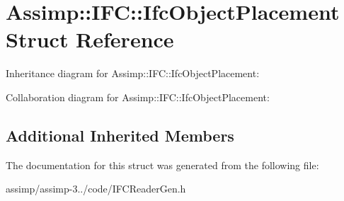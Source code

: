 \hypertarget{struct_assimp_1_1_i_f_c_1_1_ifc_object_placement}{\section{Assimp\+:\+:I\+F\+C\+:\+:Ifc\+Object\+Placement Struct Reference}
\label{struct_assimp_1_1_i_f_c_1_1_ifc_object_placement}
}


Inheritance diagram for Assimp\+:\+:I\+F\+C\+:\+:Ifc\+Object\+Placement\+:


Collaboration diagram for Assimp\+:\+:I\+F\+C\+:\+:Ifc\+Object\+Placement\+:
\subsection*{Additional Inherited Members}


The documentation for this struct was generated from the following file\+:\begin{DoxyCompactItemize}
\item 
assimp/assimp-\/3../code/I\+F\+C\+Reader\+Gen.\+h\end{DoxyCompactItemize}
